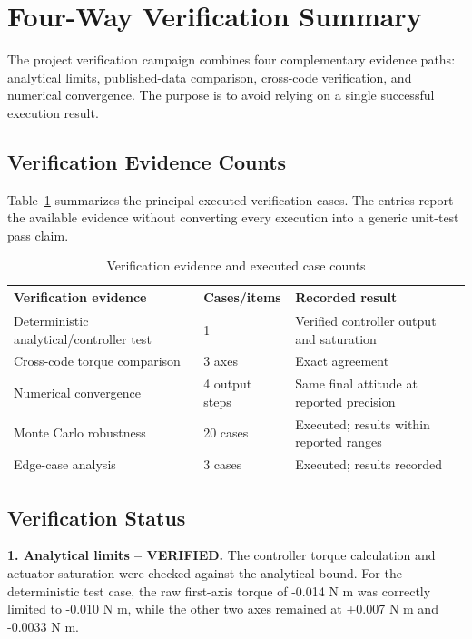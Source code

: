 \documentclass[11pt,a4paper]{article}
\begin{document}
\section{Four-Way Verification Summary}

The project verification campaign combines four complementary evidence paths: analytical limits, published-data comparison, cross-code verification, and numerical convergence\cite{assignment}. The purpose is to avoid relying on a single successful execution result.

\subsection{Verification Evidence Counts}

Table~\ref{tab:verification-evidence} summarizes the principal executed verification cases. The entries report the available evidence without converting every execution into a generic unit-test pass claim.

\begin{table}[H]
\centering
\caption{Verification evidence and executed case counts}
\label{tab:verification-evidence}
\begin{tabular}{p{}p{}p{}}
\toprule
Verification evidence & Cases/items & Recorded result \\
\midrule
Deterministic analytical/controller test & 1 & Verified controller output and saturation \\
Cross-code torque comparison & 3 axes & Exact agreement \\
Numerical convergence & 4 output steps & Same final attitude at reported precision \\
Monte Carlo robustness & 20 cases & Executed; results within reported ranges \\
Edge-case analysis & 3 cases & Executed; results recorded \\
\bottomrule
\end{tabular}
\end{table}

\subsection{Verification Status}

\textbf{1. Analytical limits -- VERIFIED.} The controller torque calculation and actuator saturation were checked against the analytical bound. For the deterministic test case, the raw first-axis torque of -0.014 N m was correctly limited to -0.010 N m, while the other two axes remained at +0.007 N m and -0.0033 N m.
\end{document}

